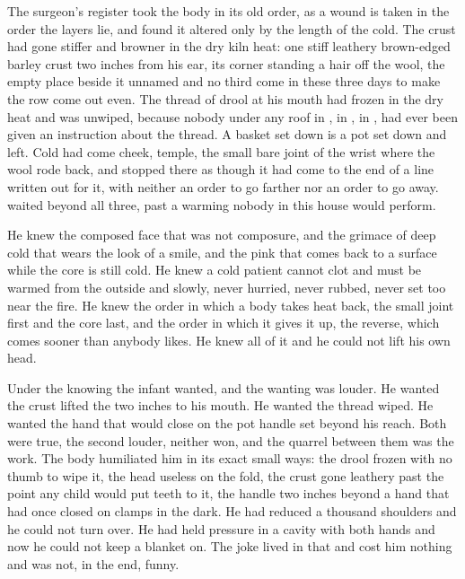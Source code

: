 The surgeon's register took the body in its old order, as a wound is taken in the order the layers lie, and found it altered only by the length of the cold. The crust had gone stiffer and browner in the dry kiln heat: one stiff leathery brown-edged barley crust two inches from his ear, its corner standing a hair off the wool, the empty place beside it unnamed and no third come in these three days to make the row come out even. The thread of drool at his mouth had frozen in the dry heat and was unwiped, because nobody under any roof in , in , in , had ever been given an instruction about the thread. A basket set down is a pot set down and left. Cold had come cheek, temple, the small bare joint of the wrist where the wool rode back, and stopped there as though it had come to the end of a line written out for it, with neither an order to go farther nor an order to go away.  waited beyond all three, past a warming nobody in this house would perform.

He knew the composed face that was not composure, and the grimace of deep cold that wears the look of a smile, and the pink that comes back to a surface while the core is still cold. He knew a cold patient cannot clot and must be warmed from the outside and slowly, never hurried, never rubbed, never set too near the fire. He knew the order in which a body takes heat back, the small joint first and the core last, and the order in which it gives it up, the reverse, which comes sooner than anybody likes. He knew all of it and he could not lift his own head.

Under the knowing the infant wanted, and the wanting was louder. He wanted the crust lifted the two inches to his mouth. He wanted the thread wiped. He wanted the hand that would close on the pot handle set beyond his reach. Both were true, the second louder, neither won, and the quarrel between them was the work. The body humiliated him in its exact small ways: the drool frozen with no thumb to wipe it, the head useless on the fold, the crust gone leathery past the point any child would put teeth to it, the handle two inches beyond a hand that had once closed on clamps in the dark. He had reduced a thousand shoulders and he could not turn over. He had held pressure in a cavity with both hands and now he could not keep a blanket on. The joke lived in that and cost him nothing and was not, in the end, funny.

\scenebreak

